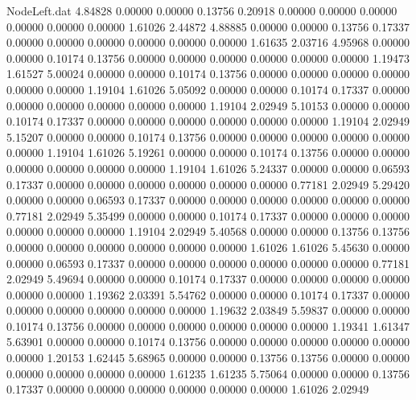 \begin{filecontents}{NodeLeft.dat}
   4.84828    0.00000    0.00000     0.13756    0.20918    0.00000    0.00000    0.00000    0.00000    0.00000    0.00000    1.61026    2.44872
   4.88885    0.00000    0.00000     0.13756    0.17337    0.00000    0.00000    0.00000    0.00000    0.00000    0.00000    1.61635    2.03716
   4.95968    0.00000    0.00000     0.10174    0.13756    0.00000    0.00000    0.00000    0.00000    0.00000    0.00000    1.19473    1.61527
   5.00024    0.00000    0.00000     0.10174    0.13756    0.00000    0.00000    0.00000    0.00000    0.00000    0.00000    1.19104    1.61026
   5.05092    0.00000    0.00000     0.10174    0.17337    0.00000    0.00000    0.00000    0.00000    0.00000    0.00000    1.19104    2.02949
   5.10153    0.00000    0.00000     0.10174    0.17337    0.00000    0.00000    0.00000    0.00000    0.00000    0.00000    1.19104    2.02949
   5.15207    0.00000    0.00000     0.10174    0.13756    0.00000    0.00000    0.00000    0.00000    0.00000    0.00000    1.19104    1.61026
   5.19261    0.00000    0.00000     0.10174    0.13756    0.00000    0.00000    0.00000    0.00000    0.00000    0.00000    1.19104    1.61026
   5.24337    0.00000    0.00000     0.06593    0.17337    0.00000    0.00000    0.00000    0.00000    0.00000    0.00000    0.77181    2.02949
   5.29420    0.00000    0.00000     0.06593    0.17337    0.00000    0.00000    0.00000    0.00000    0.00000    0.00000    0.77181    2.02949
   5.35499    0.00000    0.00000     0.10174    0.17337    0.00000    0.00000    0.00000    0.00000    0.00000    0.00000    1.19104    2.02949
   5.40568    0.00000    0.00000     0.13756    0.13756    0.00000    0.00000    0.00000    0.00000    0.00000    0.00000    1.61026    1.61026
   5.45630    0.00000    0.00000     0.06593    0.17337    0.00000    0.00000    0.00000    0.00000    0.00000    0.00000    0.77181    2.02949
   5.49694    0.00000    0.00000     0.10174    0.17337    0.00000    0.00000    0.00000    0.00000    0.00000    0.00000    1.19362    2.03391
   5.54762    0.00000    0.00000     0.10174    0.17337    0.00000    0.00000    0.00000    0.00000    0.00000    0.00000    1.19632    2.03849
   5.59837    0.00000    0.00000     0.10174    0.13756    0.00000    0.00000    0.00000    0.00000    0.00000    0.00000    1.19341    1.61347
   5.63901    0.00000    0.00000     0.10174    0.13756    0.00000    0.00000    0.00000    0.00000    0.00000    0.00000    1.20153    1.62445
   5.68965    0.00000    0.00000     0.13756    0.13756    0.00000    0.00000    0.00000    0.00000    0.00000    0.00000    1.61235    1.61235
   5.75064    0.00000    0.00000     0.13756    0.17337    0.00000    0.00000    0.00000    0.00000    0.00000    0.00000    1.61026    2.02949

\end{filecontents}
